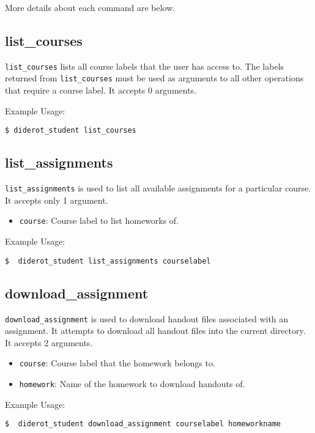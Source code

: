 More details about each command are below.

\subsection{list\_courses}

\verb|list_courses| lists all course labels that the user has access to.
%
The labels returned from \verb|list_courses| must be used as arguments to all other
operations that require a course label.
%
It accepts 0 arguments.

Example Usage:
\begin{verbatim}
$ diderot_student list_courses
\end{verbatim}

\subsection{list\_assignments}

\verb|list_assignments| is used to list all available assignments for a particular course.
%
It accepts only 1 argument.
\begin{itemize}
  \item \verb|course|: Course label to list homeworks of.
\end{itemize}

Example Usage:
\begin{verbatim}
$  diderot_student list_assignments courselabel
\end{verbatim}

\subsection{download\_assignment}

\verb|download_assignment| is used to download handout files associated with an assignment.
%
It attempts to download all handout files into the current directory.
% 
It accepts 2 arguments.

\begin{itemize}
  \item \verb|course|: Course label that the homework belongs to.
  \item \verb|homework|: Name of the homework to download handouts of.
\end{itemize}

Example Usage:
\begin{verbatim}
$  diderot_student download_assignment courselabel homeworkname
\end{verbatim}

